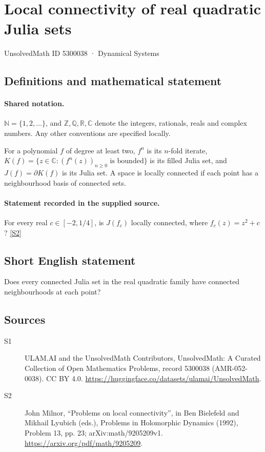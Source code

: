 \documentclass[11pt]{article}
\newcommand{\sref}[2]{\hyperlink{source:#1:#2}{[S#2]}}
\begin{document}
\setcounter{section}{5300037}
\section{Local connectivity of real quadratic Julia sets}\label{5300038}
{\small\sffamily UnsolvedMath ID 5300038 · Dynamical Systems}
\subsection{Definitions and mathematical statement}

\paragraph{Shared notation.}$\mathbb N=\{1,2,\ldots\}$, and $\mathbb Z,\mathbb Q,\mathbb R,\mathbb C$ denote the integers, rationals, reals and complex numbers. Any other conventions are specified locally.


For a polynomial $f$ of degree at least two, $f^n$ is its $n$-fold iterate, $K(f)=\{z\in\mathbb C:(f^n(z))_{n\geq0}\text{ is bounded}\}$ is its filled Julia set, and $J(f)=\partial K(f)$ is its Julia set. A space is locally connected if each point has a neighbourhood basis of connected sets.
\paragraph{Statement recorded in the supplied source.}
For every real $c\in[-2,1/4]$, is $J(f_c)$ locally connected, where $f_c(z)=z^2+c$? \sref{5300038}{2}
\subsection{Short English statement}
Does every connected Julia set in the real quadratic family have connected neighbourhoods at each point?
\subsection{Sources}
\begin{description}
\item[\hypertarget{source:5300038:1}{S1}] ULAM.AI and the UnsolvedMath Contributors, UnsolvedMath: A Curated Collection of Open Mathematics Problems, record 5300038 (AMR-052-0038). CC BY 4.0. \url{https://huggingface.co/datasets/ulamai/UnsolvedMath}.
\item[\hypertarget{source:5300038:2}{S2}] John Milnor, ``Problems on local connectivity'', in Ben Bielefeld and Mikhail Lyubich (eds.), Problems in Holomorphic Dynamics (1992), Problem 13, pp. 23; arXiv:math/9205209v1. \url{https://arxiv.org/pdf/math/9205209}.
\end{description}
\label{end:5300038}
\end{document}
